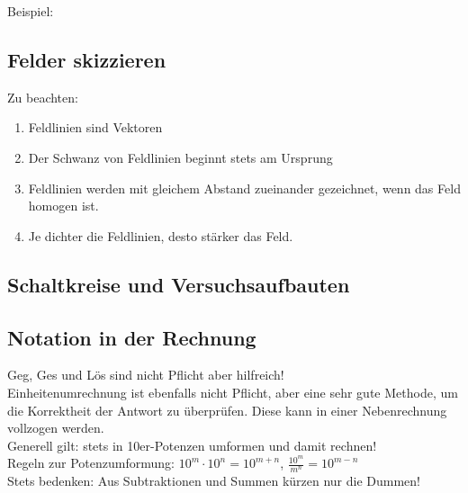 \documentclass{article}
\begin{document}
        Beispiel:

        \begin{figure}[h]
        \centering
    \end{figure}
        
    \newpage
        \subsection{Felder skizzieren}
        
            Zu beachten:
            \begin{enumerate}
                \item Feldlinien sind Vektoren
                \item Der Schwanz von Feldlinien beginnt stets am Ursprung
                \item Feldlinien werden mit gleichem Abstand zueinander gezeichnet, wenn das Feld homogen ist.
                \item Je dichter die Feldlinien, desto stärker das Feld.
            \end{enumerate}

        \subsection{Schaltkreise und Versuchsaufbauten}

        \subsection{Notation in der Rechnung}

            Geg, Ges und Lös sind nicht Pflicht aber hilfreich! \\
            Einheitenumrechnung ist ebenfalls nicht Pflicht, aber eine sehr gute Methode, um die Korrektheit der Antwort zu überprüfen. Diese kann in einer Nebenrechnung vollzogen werden. \\
            Generell gilt: stets in 10er-Potenzen umformen und damit rechnen! \\
            Regeln zur Potenzumformung: $10^m \cdot 10^n = 10^{m+n}$, $\frac{10^m}{m^n} = 10^{m-n}$ \\
            Stets bedenken: Aus Subtraktionen und Summen kürzen nur die Dummen! \\
\end{document}
